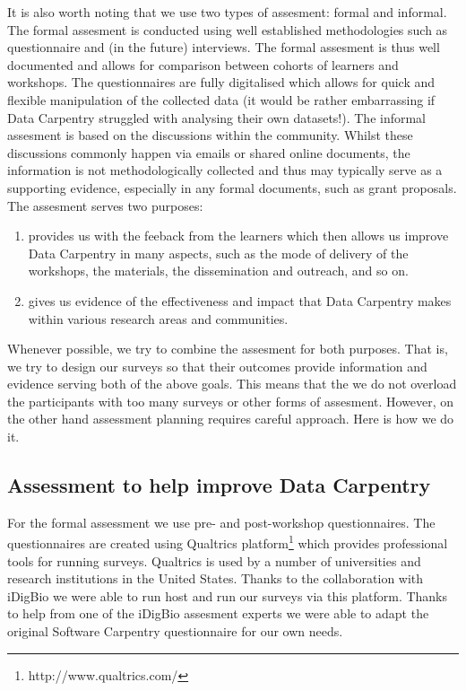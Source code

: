 \documentclass[15]{idcc}
\begin{document}
\begin{itemize}
It is also worth noting that we use two types of assesment: formal and informal. The formal assesment is conducted using well established 
methodologies such as questionnaire and (in the future) interviews. The formal assesment is thus well documented and allows for comparison
between cohorts of learners and workshops. The questionnaires are fully digitalised which allows for quick and flexible manipulation of the
collected data (it would be rather embarrassing if Data Carpentry struggled with analysing their own datasets!). The informal assesment is 
based on the discussions within the community. Whilst these discussions commonly happen via emails or shared online documents, the information
is not methodologically collected and thus may typically serve as a supporting evidence, especially in any formal documents, such as grant
proposals.\\

The assesment serves two purposes: 
\begin{enumerate}
\item provides us with the feeback from the learners which then allows us improve Data Carpentry in many aspects, such as the mode of
delivery of the workshops, the materials, the dissemination and outreach, and so on.
\item gives us evidence of the effectiveness and impact that Data Carpentry makes within various research areas and communities.
\end{enumerate}

Whenever possible, we try to combine the assesment for both purposes. That is, we try to design our surveys so that their outcomes provide
information and evidence serving both of the above goals. This means that the we do not overload the participants with too many surveys
or other forms of assesment. However, on the other hand assessment planning requires careful approach. Here is how we do it.


\subsection{Assessment to help improve Data Carpentry}
For the formal assessment we use pre- and post-workshop questionnaires. The questionnaires are created using Qualtrics platform\footnote{http://www.qualtrics.com/}
which provides professional tools for running surveys. Qualtrics is used by a number of universities and research institutions in the United States. 
Thanks to the collaboration with iDigBio we were able to run host and run our surveys via this platform. Thanks to help from one of the iDigBio
assesment experts we were able to adapt the original Software Carpentry questionnaire for our own needs. \\


\end{itemize}
\end{document}
